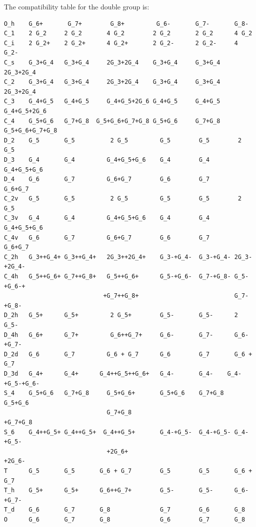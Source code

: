 \documentclass[12pt,a4paper]{article}
\begin{document}
The compatibility table for the double group is:
\begin{verbatim}
O_h    G_6+       G_7+        G_8+         G_6-       G_7-       G_8-
C_1    2 G_2     2 G_2       4 G_2        2 G_2       2 G_2      4 G_2
C_i    2 G_2+    2 G_2+      4 G_2+       2 G_2-      2 G_2-     4 G_2-
C_s    G_3+G_4   G_3+G_4     2G_3+2G_4    G_3+G_4     G_3+G_4   2G_3+2G_4
C_2    G_3+G_4   G_3+G_4     2G_3+2G_4    G_3+G_4     G_3+G_4   2G_3+2G_4
C_3    G_4+G_5   G_4+G_5     G_4+G_5+2G_6 G_4+G_5     G_4+G_5   G_4+G_5+2G_6
C_4    G_5+G_6   G_7+G_8  G_5+G_6+G_7+G_8 G_5+G_6     G_7+G_8 G_5+G_6+G_7+G_8
D_2    G_5       G_5          2 G_5         G_5        G_5        2 G_5
D_3    G_4       G_4         G_4+G_5+G_6    G_4        G_4       G_4+G_5+G_6
D_4    G_6       G_7         G_6+G_7        G_6        G_7       G_6+G_7
C_2v   G_5       G_5          2 G_5         G_5        G_5        2 G_5
C_3v   G_4       G_4         G_4+G_5+G_6    G_4        G_4       G_4+G_5+G_6
C_4v   G_6       G_7         G_6+G_7        G_6        G_7       G_6+G_7
C_2h   G_3++G_4+ G_3++G_4+   2G_3++2G_4+    G_3-+G_4-  G_3-+G_4- 2G_3-+2G_4- 
C_4h   G_5++G_6+ G_7++G_8+   G_5++G_6+      G_5-+G_6-  G_7-+G_8- G_5-+G_6-+
                            +G_7++G_8+                           G_7-+G_8- 
D_2h   G_5+      G_5+         2 G_5+        G_5-       G_5-      2 G_5-
D_4h   G_6+      G_7+         G_6++G_7+     G_6-       G_7-      G_6-+G_7-
D_2d   G_6       G_7         G_6 + G_7      G_6        G_7       G_6 + G_7
D_3d   G_4+      G_4+      G_4++G_5++G_6+   G_4-       G_4-    G_4-+G_5-+G_6-
S_4    G_5+G_6   G_7+G_8     G_5+G_6+       G_5+G_6    G_7+G_8   G_5+G_6
                             G_7+G_8                             +G_7+G_8
S_6    G_4++G_5+ G_4++G_5+  G_4++G_5+       G_4-+G_5-  G_4-+G_5- G_4-+G_5-
                             +2G_6+                               +2G_6-
T      G_5       G_5       G_6 + G_7        G_5        G_5       G_6 + G_7
T_h    G_5+      G_5+      G_6++G_7+        G_5-       G_5-      G_6-+G_7-
T_d    G_6       G_7       G_8              G_7        G_6       G_8
O      G_6       G_7       G_8              G_6        G_7       G_8    
\end{verbatim}

\newpage
\end{document}
